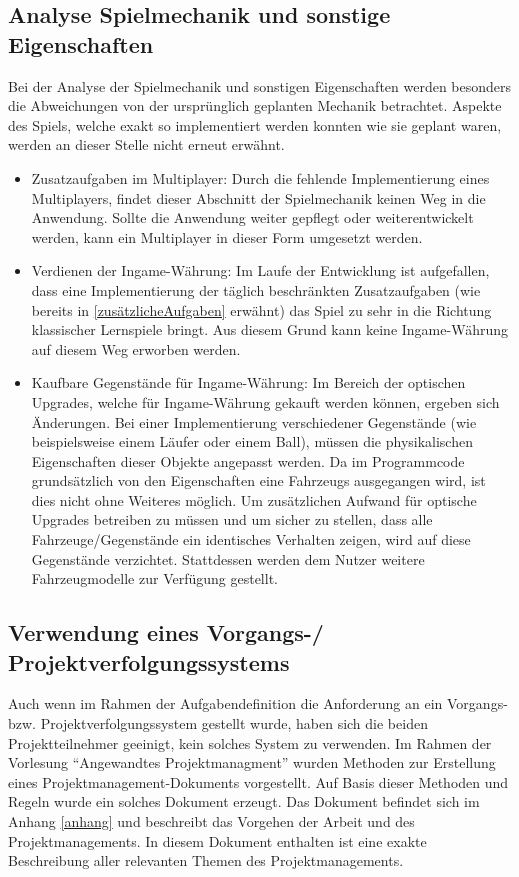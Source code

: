 \subsection{Analyse Spielmechanik und sonstige Eigenschaften}
Bei der Analyse der Spielmechanik und sonstigen Eigenschaften werden besonders die Abweichungen von der ursprünglich geplanten Mechanik betrachtet. Aspekte des Spiels, welche exakt so implementiert werden konnten wie sie geplant waren, werden an dieser Stelle nicht erneut erwähnt.
\begin{itemize}
    \item{Zusatzaufgaben im Multiplayer: Durch die fehlende Implementierung eines Multiplayers, findet dieser Abschnitt der Spielmechanik keinen Weg in die Anwendung. Sollte die Anwendung weiter gepflegt oder weiterentwickelt werden, kann ein Multiplayer in dieser Form umgesetzt werden.}
    \item{Verdienen der Ingame-Währung: Im Laufe der Entwicklung ist aufgefallen, dass eine Implementierung der täglich beschränkten Zusatzaufgaben (wie bereits in \ref{zusätzlicheAufgaben} erwähnt) das Spiel zu sehr in die Richtung klassischer Lernspiele bringt. Aus diesem Grund kann keine Ingame-Währung auf diesem Weg erworben werden.}
    \item{Kaufbare Gegenstände für Ingame-Währung: Im Bereich der optischen Upgrades, welche für Ingame-Währung gekauft werden können, ergeben sich Änderungen. Bei einer Implementierung verschiedener Gegenstände (wie beispielsweise einem Läufer oder einem Ball), müssen die physikalischen Eigenschaften dieser Objekte angepasst werden. Da im Programmcode grundsätzlich von den Eigenschaften eine Fahrzeugs ausgegangen wird, ist dies nicht ohne Weiteres möglich. Um zusätzlichen Aufwand für optische Upgrades betreiben zu müssen und um sicher zu stellen, dass alle Fahrzeuge/Gegenstände ein identisches Verhalten zeigen, wird auf diese Gegenstände verzichtet. Stattdessen werden dem Nutzer weitere Fahrzeugmodelle zur Verfügung gestellt.}
\end{itemize}

\subsection{Verwendung eines Vorgangs-/ Projektverfolgungssystems}
Auch wenn im Rahmen der Aufgabendefinition die Anforderung an ein Vorgangs- bzw. Projektverfolgungssystem gestellt wurde, haben sich die beiden Projektteilnehmer geeinigt, kein solches System zu verwenden.
Im Rahmen der Vorlesung \enquote{Angewandtes Projektmanagment} wurden Methoden zur Erstellung eines Projektmanagement-Dokuments vorgestellt. Auf Basis dieser Methoden und Regeln wurde ein solches Dokument erzeugt. Das Dokument befindet sich im Anhang \ref{anhang} und beschreibt das Vorgehen der Arbeit und des Projektmanagements. In diesem Dokument enthalten ist eine exakte Beschreibung aller relevanten Themen des Projektmanagements.

